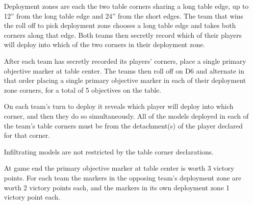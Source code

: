 
\teaser{}

\begin{tablesetup}

  Deployment zones are each the two table corners sharing a long table
  edge, up to 12'' from the long table edge and 24'' from the short
  edges.  The team that wins the roll off to pick deployment zone
  chooses a long table edge and takes both corners along that edge.
  Both teams then secretly record which of their players will deploy
  into which of the two corners in their deployment zone.

  \bigskip%
  After each team has secretly recorded its players' corners, place a
  single primary objective marker at table center.  The teams then
  roll off on D6 and alternate in that order placing a single primary
  objective marker in each of their deployment zone corners, for a
  total of 5 objectives on the table.

  \bigskip%
  On each team's turn to deploy it reveals which player will deploy
  into which corner, and then they do so simultaneously.  All of the
  models deployed in each of the team's table corners must be from the
  detachment(s) of the player declared for that corner.

  Infiltrating models are not restricted by the table corner
  declarations.

\end{tablesetup}

\begin{missionrules}

\nightfighting
\end{missionrules}


\begin{scoring}
  
\begin{primaries}

  At game end the primary objective marker at table center is worth 3
  victory points.  For each team the markers in the opposing team's
  deployment zone are worth 2 victory points each, and the markers in
  its own deployment zone 1 victory point each.

\end{primaries}

\begin{secondaries}
  \seizeground

  \seekanddestroy

  \meatgrinder
\end{secondaries}

\end{scoring}
